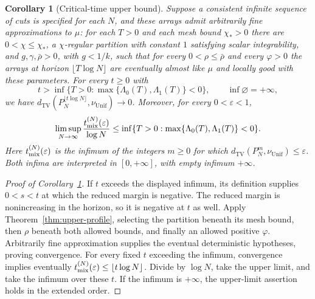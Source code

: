 \documentclass[11pt]{article}
\numberwithin{equation}{section}
\newtheorem{corollary}[theorem]{Corollary}
\theoremstyle{definition}
\theoremstyle{remark}
\newcommand{\TV}{\mathrm{TV}}
\newcommand{\Unif}{\mathrm{Unif}}
\newcommand{\dTV}{d_{\TV}}
\newcommand{\nuUnif}{\nu_{\Unif}}
\newcommand{\1}{\mathbf 1}
\begin{document}

\begin{corollary}[Critical-time upper bound]%
\label{cor:upper-critical}
Suppose a consistent infinite sequence of cuts is specified for each
$N$, and these arrays admit arbitrarily fine approximations to $\mu$:
for each $T>0$ and each mesh bound $\chi_*>0$ there are
$0<\chi\le\chi_*$, a $\chi$-regular partition with constant $1$ satisfying
scalar integrability, and $g,\gamma,\bar\rho>0$, with $g<1/k$,
such that for every $0<\rho\le\bar\rho$ and every $\varphi>0$ the
arrays at horizon $\lfloor T\log N\rfloor$ are eventually almost
like $\mu$ and locally good with these parameters. For every $t\ge0$ with
\[
 t>\inf\{T>0:\max\{\Lambda_0(T),\Lambda_1(T)\}<0\},
 \qquad \inf\varnothing=+\infty,
\]
we have $\dTV(P_N^{\lfloor t\log N\rfloor},\nuUnif)\to0$.
Moreover, for every $0<\varepsilon<1$,
\[
 \limsup_{N\to\infty}\frac{t_{\rm mix}^{(N)}(\varepsilon)}{\log N}
       \le\inf\{T>0:\max\{\Lambda_0(T),\Lambda_1(T)\}<0\}.
\]
Here $t_{\rm mix}^{(N)}(\varepsilon)$ is the infimum of the integers
$m\ge0$ for which $\dTV(P_N^m,\nuUnif)\le\varepsilon$.
Both infima are interpreted in $[0,+\infty]$, with empty infimum
$+\infty$.
\end{corollary}

\begin{proof}[Proof of Corollary~\ref{cor:upper-critical}]
If $t$ exceeds the displayed infimum, its definition supplies $0<s<t$ at which
the reduced margin is negative. The reduced margin is nonincreasing
in the horizon, so it is negative at $t$ as well. Apply
Theorem~\ref{thm:upper-profile}, selecting the partition beneath its
mesh bound, then $\rho$ beneath both allowed bounds, and finally an
allowed positive $\varphi$. Arbitrarily fine approximation supplies
the eventual deterministic hypotheses, proving convergence.
For every fixed $t$ exceeding the infimum, convergence implies eventually
$t_{\rm mix}^{(N)}(\varepsilon)\le\lfloor t\log N\rfloor$.
Divide by $\log N$, take the upper limit, and take the infimum over
these $t$. If the infimum is $+\infty$, the upper-limit assertion
holds in the extended order.
\end{proof}
\end{document}
